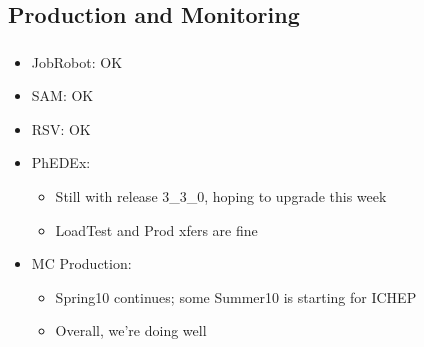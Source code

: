 \documentclass{beamer}
\begin{document}
\subsection{Production and Monitoring}
\begin{frame}
\frametitle{}

\begin{itemize}
	\item JobRobot: OK
	\item SAM: OK
	\item RSV: OK
	\item PhEDEx:
	\begin{itemize}
		\item Still with release 3\_3\_0, hoping to upgrade this week
		\item LoadTest and Prod xfers are fine
	\end{itemize}
	\item MC Production:
	\begin{itemize}
		\item Spring10 continues; some Summer10 is starting for ICHEP
		\item Overall, we're doing well
	\end{itemize}
\end{itemize}
\end{frame}
\end{document}
